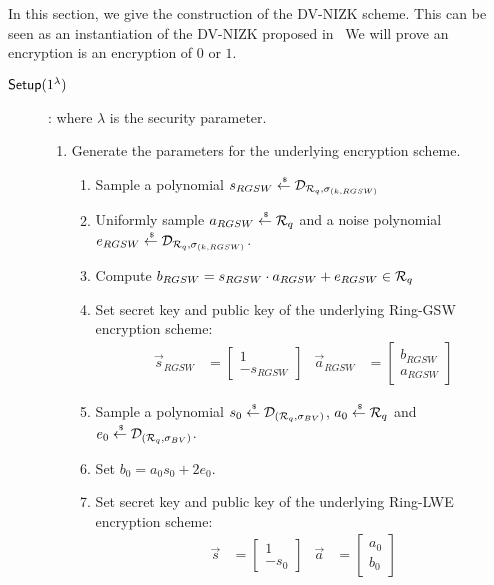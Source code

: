 In this section, we give the construction of the DV-NIZK scheme.
This can be seen as an instantiation of the DV-NIZK proposed in~\cite{DBLP:conf/pkc/ChaidosG15}
We will prove an encryption is an encryption of $0$ or $1$.

\begin{description}
\item[${\mathsf{Setup}}(1^\lambda)$]: where $\lambda$ is the security parameter.
  \begin{enumerate}
    \item Generate the parameters for the underlying encryption scheme.
      \begin{enumerate}
      \item Sample a polynomial $s_{RGSW} \stackrel{{\scriptscriptstyle \mkern4mu \$}}{\gets} \mathcal{D}_{{\mathcal{R}}_q, \sigma_{(k,RGSW)}}$
      \item Uniformly sample $a_{RGSW} \stackrel{{\scriptscriptstyle \mkern4mu \$}}{\gets} {\mathcal{R}}_q$ and a noise polynomial $e_{RGSW} \stackrel{{\scriptscriptstyle \mkern4mu \$}}{\gets} \mathcal{D}_{{\mathcal{R}}_q, \sigma_{(k, RGSW)}}$.
      \item Compute $b_{RGSW} = s_{RGSW} \cdot a_{RGSW} + e_{RGSW} \in {\mathcal{R}}_q$
      \item Set secret key and public key of the underlying Ring-GSW encryption scheme:
        \begin{align*}
          \vec{s}_{RGSW} &= \begin{bmatrix} 1 \\ -s_{RGSW} \end{bmatrix}  & \vec{a}_{RGSW} &=  \begin{bmatrix} b_{RGSW} \\ a_{RGSW}\end{bmatrix}
        \end{align*}
      \item Sample a polynomial $s_0 \stackrel{{\scriptscriptstyle \mkern4mu \$}}{\gets} \mathcal{D}_{({\mathcal{R}}_q, \sigma_{BV})}$, $a_0 \stackrel{{\scriptscriptstyle \mkern4mu \$}}{\gets} {\mathcal{R}}_q$ and $e_0 \stackrel{{\scriptscriptstyle \mkern4mu \$}}{\gets} \mathcal{D}_{({\mathcal{R}}_q, \sigma_{BV})}$.
      \item Set $b_0 = a_0 s_0 + 2 e_0$.
      \item Set secret key and public key of the underlying Ring-LWE encryption scheme:
        \begin{align*}
          \vec{s} &= \begin{bmatrix} 1 \\ -s_0\end{bmatrix} & \vec{a} &= \begin{bmatrix} a_0 \\ b_0\end{bmatrix}

\end{align*}
\end{enumerate}
\end{enumerate}
\end{description}
